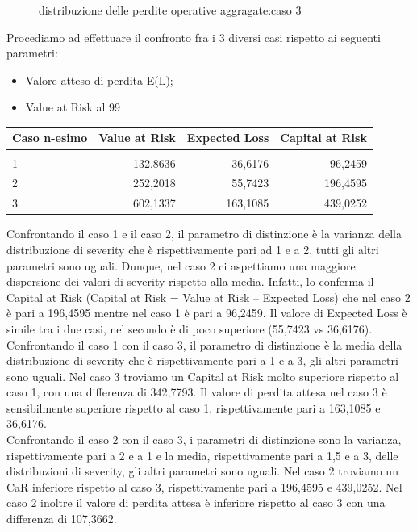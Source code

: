 \documentclass[titlepage]{article}
\begin{document}
\begin{itemize}
{\begin{figure}[htbp]
	\caption{\label{fig:losss.png}distribuzione delle perdite operative aggragate:caso 3}
\end{figure}
Procediamo ad effettuare il confronto fra i 3 diversi casi rispetto ai seguenti parametri:
\begin{itemize}
\item 	Valore atteso di perdita E(L);
\item 	Value at Risk al 99%
\end{itemize}
\begin{table}[htbp]
	\centering
	\begin{tabular}{l|rrr}
		Caso n-esimo & Value at Risk & Expected Loss& Capital at Risk \\\hline
		\\
		1 & 132,8636&36,6176&96,2459 \\
		2 & 252,2018 &55,7423&196,4595\\
		3 & 602,1337 &163,1085&439,0252
	\end{tabular}
\end{table}
Confrontando il caso 1 e il caso 2, il parametro di distinzione è la varianza della distribuzione di severity che è rispettivamente pari ad 1 e a 2, tutti gli altri parametri sono uguali. Dunque, nel caso 2 ci aspettiamo una maggiore dispersione dei valori di severity rispetto alla media. Infatti, lo conferma il Capital at Risk (Capital at Risk = Value at Risk – Expected Loss) che nel caso 2 è pari a 196,4595 mentre nel caso 1 è pari a 96,2459. Il valore di Expected Loss è simile tra i due casi, nel secondo è di poco superiore (55,7423 vs 36,6176).
\\
Confrontando il caso 1 con il caso 3, il parametro di distinzione è la media della distribuzione di severity che è rispettivamente pari a 1 e a 3, gli altri parametri sono uguali. Nel caso 3 troviamo un Capital at Risk molto superiore rispetto al caso 1, con una differenza di 342,7793. Il valore di perdita attesa nel caso 3 è sensibilmente superiore rispetto al caso 1, rispettivamente pari a 163,1085 e 36,6176.
\\
Confrontando il caso 2 con il caso 3, i parametri di distinzione sono la varianza, rispettivamente pari a 2 e a 1 e la media, rispettivamente pari a 1,5 e a 3, delle distribuzioni di severity, gli altri parametri sono uguali. Nel caso 2 troviamo un CaR inferiore rispetto al caso 3, rispettivamente pari a 196,4595 e 439,0252. Nel caso 2 inoltre il valore di perdita attesa è inferiore rispetto al caso 3 con una differenza di 107,3662.
\\
}
\end{itemize}
\end{document}
